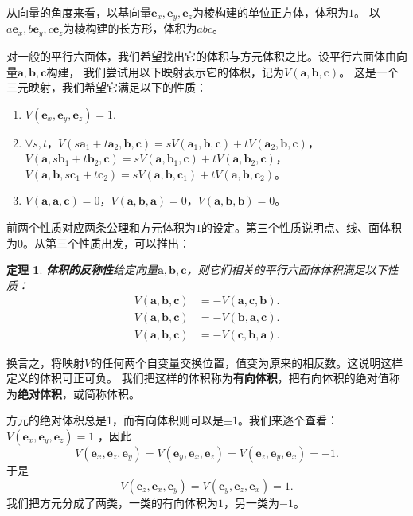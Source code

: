 \documentclass[12pt,UTF8]{ctexbook}
\newtheorem{tm}{定理}[section]
\begin{document}
从向量的角度来看，以基向量$\mathbf{e}_x, \mathbf{e}_y, \mathbf{e}_z$为棱构建的单位正方体，体积为$1$。
以$a\mathbf{e}_x, b\mathbf{e}_y, c\mathbf{e}_z$为棱构建的长方形，体积为$abc$。

对一般的平行六面体，我们希望找出它的体积与方元体积之比。设平行六面体由向量$\mathbf{a},\mathbf{b},\mathbf{c}$构建，
我们尝试用以下映射表示它的体积，记为$V(\mathbf{a},\mathbf{b},\mathbf{c})$。
这是一个三元映射，我们希望它满足以下的性质：
\begin{enumerate}
    \item $V(\mathbf{e}_x, \mathbf{e}_y, \mathbf{e}_z) = 1.$ 
    \item $\forall s,t$，$V(s\mathbf{a}_1+t\mathbf{a}_2,\mathbf{b},\mathbf{c}) = sV(\mathbf{a}_1,\mathbf{b},\mathbf{c})+tV(\mathbf{a}_2,\mathbf{b},\mathbf{c})$，$V(\mathbf{a},s\mathbf{b}_1+t\mathbf{b}_2,\mathbf{c}) = sV(\mathbf{a},\mathbf{b}_1,\mathbf{c})+tV(\mathbf{a},\mathbf{b}_2,\mathbf{c})$，$V(\mathbf{a},\mathbf{b},s\mathbf{c}_1+t\mathbf{c}_2) = sV(\mathbf{a},\mathbf{b},\mathbf{c}_1)+tV(\mathbf{a},\mathbf{b},\mathbf{c}_2)$。
    \item $V(\mathbf{a},\mathbf{a},\mathbf{c}) = 0$，$V(\mathbf{a},\mathbf{b},\mathbf{a})=0$，$V(\mathbf{a},\mathbf{b},\mathbf{b})=0$。
\end{enumerate}
前两个性质对应两条公理和方元体积为$1$的设定。第三个性质说明点、线、面体积为$0$。从第三个性质出发，可以推出：
\begin{tm}{\textbf{体积的反称性}}\label{tm:3-0-0}
    给定向量$\mathbf{a},\mathbf{b},\mathbf{c}$，则它们相关的平行六面体体积满足以下性质：
    \begin{align*}
        V(\mathbf{a},\mathbf{b},\mathbf{c}) &= -V(\mathbf{a},\mathbf{c},\mathbf{b}).  \\
        V(\mathbf{a},\mathbf{b},\mathbf{c}) &= -V(\mathbf{b},\mathbf{a},\mathbf{c}).  \\
        V(\mathbf{a},\mathbf{b},\mathbf{c}) &= -V(\mathbf{c},\mathbf{b},\mathbf{a}).  
    \end{align*}
\end{tm}
换言之，将映射$V$的任何两个自变量交换位置，值变为原来的相反数。这说明这样定义的体积可正可负。
我们把这样的体积称为\textbf{有向体积}，把有向体积的绝对值称为\textbf{绝对体积}，或简称体积。

方元的绝对体积总是$1$，而有向体积则可以是$\pm 1$。我们来逐个查看：
$V(\mathbf{e}_x, \mathbf{e}_y, \mathbf{e}_z) = 1$ ，因此
$$ V(\mathbf{e}_x, \mathbf{e}_z, \mathbf{e}_y) = V(\mathbf{e}_y, \mathbf{e}_x, \mathbf{e}_z)  = V(\mathbf{e}_z, \mathbf{e}_y, \mathbf{e}_x)  = -1.$$
于是
$$ V(\mathbf{e}_z, \mathbf{e}_x, \mathbf{e}_y) = V(\mathbf{e}_y, \mathbf{e}_z, \mathbf{e}_x)   = 1.$$
我们把方元分成了两类，一类的有向体积为$1$，另一类为$-1$。
\end{document}
